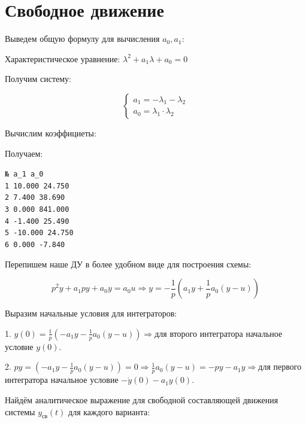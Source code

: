 \section{Свободное движение}


Выведем общую формулу для вычисления $a_0 ,a_1$:

Характеристическое уравнение: $\lambda^2 +a_1 \lambda +a_0 =0$

Получим систему:


\begin{par}
$$\left\lbrace \begin{array}{c}
a_1 =-\lambda_1 -\lambda_2 \\
a_0 =\lambda_1 \cdot \lambda_2 
\end{array}\right.$$
\end{par}


Вычислим коэффициеты:

Получаем:

\begin{par}
    \begin{flushleft}
\texttt{№  a\_1		 a\_0}\\
\texttt{1  10.000	 24.750}\\
\texttt{2   7.400	 38.690}\\
\texttt{3   0.000	841.000}\\
\texttt{4  -1.400	 25.490}\\
\texttt{5 -10.000	 24.750}\\
\texttt{6   0.000	 -7.840}\\
    \end{flushleft}
\end{par}
Перепишем наше ДУ в более удобном виде для построения схемы:

\begin{par}
$$p^2 y+a_1 py+a_0 y=a_0 u\Rightarrow y=-\frac{1}{p}(a_1 y+\frac{1}{p}a_0 (y-u))$$
\end{par}


Выразим начальные условия для интеграторов:

1. $y(0)=\frac{1}{p}(-a_1 y-\frac{1}{p}a_0 (y-u))\Rightarrow$для второго интегратора начальное условие $y(0)$.



2. $py=(-a_1 y-\frac{1}{p}a_0 (y-u))=0\Rightarrow \frac{1}{p}a_0 (y-u)=-py-a_1 y\Rightarrow$для первого интегратора начальное условие $-\dot{y} (0)-a_1 y(0)$.



Найдём аналитическое выражение для свободной составляющей движения системы $y_{\textrm{св}} (t)$ для каждого варианта:\\

